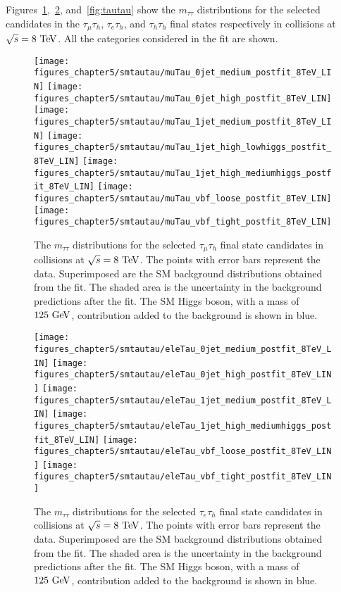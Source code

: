 Figures~\ref{fig:mtau},~\ref{fig:etau}, and~\ref{fig:tautau} show the $m_{\tau\tau}$ distributions for the selected candidates in the $\tau_{\mu}\tau_{h}$, $\tau_{e}\tau_{h}$, and $\tau_{h}\tau_{h}$ final states respectively in collisions at $\sqrt{s}=8~\mathrm{Te\kern -0.1em V}$. All the categories considered in the fit are shown.
\begin{figure}[htbp]
\centering
\texttt{[image: figures\_chapter5/smtautau/muTau\_0jet\_medium\_postfit\_8TeV\_LIN]}
\texttt{[image: figures\_chapter5/smtautau/muTau\_0jet\_high\_postfit\_8TeV\_LIN]}
\texttt{[image: figures\_chapter5/smtautau/muTau\_1jet\_medium\_postfit\_8TeV\_LIN]}
\texttt{[image: figures\_chapter5/smtautau/muTau\_1jet\_high\_lowhiggs\_postfit\_8TeV\_LIN]}
\texttt{[image: figures\_chapter5/smtautau/muTau\_1jet\_high\_mediumhiggs\_postfit\_8TeV\_LIN]}
\texttt{[image: figures\_chapter5/smtautau/muTau\_vbf\_loose\_postfit\_8TeV\_LIN]}
\texttt{[image: figures\_chapter5/smtautau/muTau\_vbf\_tight\_postfit\_8TeV\_LIN]}
\caption{The $m_{\tau\tau}$ distributions for the selected $\tau_{\mu}\tau_{h}$ final state candidates in collisions at $\sqrt{s}=8~\mathrm{Te\kern -0.1em V}$. The points with error bars represent the data. Superimposed are the SM background distributions obtained from the fit. The shaded area is the uncertainty in the background predictions after the fit. The SM Higgs boson, with a mass of $125~\mathrm{Ge\kern -0.1em V}$, contribution added to the background is shown in blue.}
\label{fig:mtau}
\end{figure}
\begin{figure}[htbp]
\centering
\texttt{[image: figures\_chapter5/smtautau/eleTau\_0jet\_medium\_postfit\_8TeV\_LIN]}
\texttt{[image: figures\_chapter5/smtautau/eleTau\_0jet\_high\_postfit\_8TeV\_LIN]}
\texttt{[image: figures\_chapter5/smtautau/eleTau\_1jet\_medium\_postfit\_8TeV\_LIN]}
\texttt{[image: figures\_chapter5/smtautau/eleTau\_1jet\_high\_mediumhiggs\_postfit\_8TeV\_LIN]}
\texttt{[image: figures\_chapter5/smtautau/eleTau\_vbf\_loose\_postfit\_8TeV\_LIN]}
\texttt{[image: figures\_chapter5/smtautau/eleTau\_vbf\_tight\_postfit\_8TeV\_LIN]}
\caption{The $m_{\tau\tau}$ distributions for the selected $\tau_{e}\tau_{h}$ final state candidates in collisions at $\sqrt{s}=8~\mathrm{Te\kern -0.1em V}$. The points with error bars represent the data. Superimposed are the SM background distributions obtained from the fit. The shaded area is the uncertainty in the background predictions after the fit. The SM Higgs boson, with a mass of $125~\mathrm{Ge\kern -0.1em V}$, contribution added to the background is shown in blue.}
\label{fig:etau}
\end{figure}
